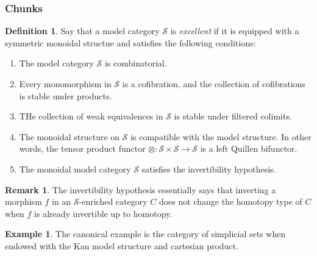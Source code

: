 \documentclass[letterpaper]{article}
\theoremstyle{definition}
\newtheorem{example}[lemma]{Example}
\newtheorem{definition}[lemma]{Definition}
\newtheorem{remark}[lemma]{Remark}
\newcommand{\mc}{\mathcal}
\begin{document}
\subsubsection{Chunks}
\begin{definition}
Say that a model category $\mc S$ is \emph{excellent} if it is
equipped with a symmetric monoidal structue and satisfies the
following conditions:
\begin{enumerate}
\item The model category $\mc S$ is combinatorial.
\item Every monomorphism in $\mc S$ is a cofibration, and the
  collection of cofibrations is stable under products.
\item THe collection of weak equivalences in $\mc S$ is stable under
  filtered colimits.
\item The monoidal structure on $\mc S$ is compatible with the model
  structure. In other words, the tensor product functor $\otimes : \mc
  S \times \mc S \rightarrow \mc S$ is a left Quillen bifunctor.
\item The monoidal model category $\mc S$ satisfies the invertibility
  hypothesis. 
\end{enumerate}

\begin{remark}
The invertibility hypothesis essentially says that inverting a
morphism $f$ in an $\mc S$-enriched category $C$ does not change the
homotopy type of $C$ when $f$ is already invertible up to homotopy. 
\end{remark}
\begin{example}
The canonical example is the category of simplicial sets when endowed
with the Kan model structure and cartesian product. 
\end{example}
\end{definition}
\end{document}
